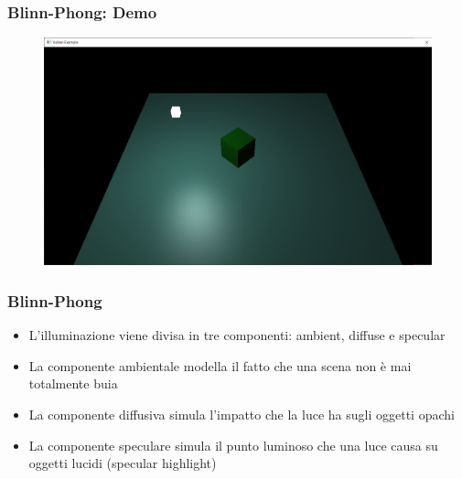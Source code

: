 \begin{frame}
\frametitle{Blinn-Phong: Demo}
\begin{figure}[ht]
    \centering
    \includegraphics[scale=0.25]{images/SlidesBlinnPhong/SceneMaterialsLight.png}
\end{figure}
\end{frame}

\begin{frame}
\frametitle{Blinn-Phong}
\begin{itemize}
\item L'illuminazione viene divisa in tre componenti: ambient, diffuse e specular
\item La componente ambientale modella il fatto che una scena non è mai totalmente buia
\item La componente diffusiva simula l'impatto che la luce ha sugli oggetti opachi
\item La componente speculare simula il punto luminoso che una luce causa su oggetti lucidi (specular highlight)
\end{itemize}
\end{frame}
